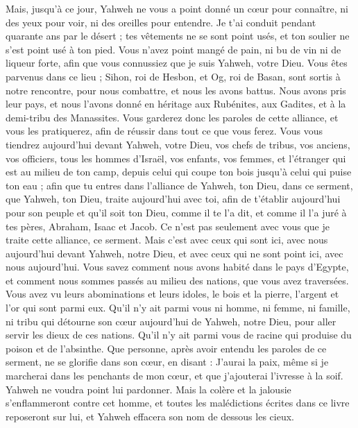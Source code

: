 \begin{multicols}{2}
Mais, jusqu'à ce jour, Yahweh ne vous a point donné un cœur pour connaître, ni des yeux pour voir, ni des oreilles pour entendre.
Je t'ai conduit pendant quarante ans par le désert ; tes vêtements ne se sont point usés, et ton soulier ne s'est point usé à ton pied.
Vous n'avez point mangé de pain, ni bu de vin ni de liqueur forte, afin que vous connussiez que je suis Yahweh, votre Dieu.
Vous êtes parvenus dans ce lieu ; Sihon, roi de Hesbon, et Og, roi de Basan, sont sortis à notre rencontre, pour nous combattre, et nous les avons battus.
Nous avons pris leur pays, et nous l'avons donné en héritage aux Rubénites, aux Gadites, et à la demi-tribu des Manassites.
Vous garderez donc les paroles de cette alliance, et vous les pratiquerez, afin de réussir dans tout ce que vous ferez.
Vous vous tiendrez aujourd'hui devant Yahweh, votre Dieu, vos chefs de tribus, vos anciens, vos officiers, tous les hommes d'Israël,
vos enfants, vos femmes, et l'étranger qui est au milieu de ton camp, depuis celui qui coupe ton bois jusqu'à celui qui puise ton eau ;
afin que tu entres dans l'alliance de Yahweh, ton Dieu, dans ce serment, que Yahweh, ton Dieu, traite aujourd'hui avec toi,
afin de t'établir aujourd'hui pour son peuple et qu'il soit ton Dieu, comme il te l'a dit, et comme il l'a juré à tes pères, Abraham, Isaac et Jacob.
Ce n'est pas seulement avec vous que je traite cette alliance, ce serment.
Mais c'est avec ceux qui sont ici, avec nous aujourd'hui devant Yahweh, notre Dieu, et avec ceux qui ne sont point ici, avec nous aujourd'hui.
Vous savez comment nous avons habité dans le pays d'Egypte, et comment nous sommes passés au milieu des nations, que vous avez traversées.
Vous avez vu leurs abominations et leurs idoles, le bois et la pierre, l'argent et l'or qui sont parmi eux.
Qu'il n'y ait parmi vous ni homme, ni femme, ni famille, ni tribu qui détourne son cœur aujourd'hui de Yahweh, notre Dieu, pour aller servir les dieux de ces nations. Qu'il n'y ait parmi vous de racine qui produise du poison et de l'absinthe.
Que personne, après avoir entendu les paroles de ce serment, ne se glorifie dans son cœur, en disant : J'aurai la paix, même si je marcherai dans les penchants de mon cœur, et que j'ajouterai l'ivresse à la soif.
Yahweh ne voudra point lui pardonner. Mais la colère et la jalousie s'enflammeront contre cet homme, et toutes les malédictions écrites dans ce livre reposeront sur lui, et Yahweh effacera son nom de dessous les cieux.

\end{multicols}
